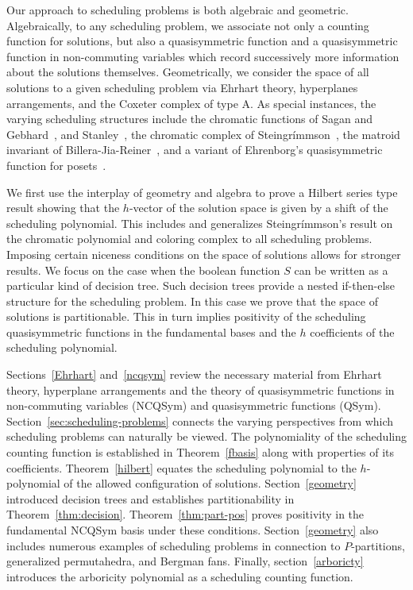 \documentclass[12pt,reqno]{amsart}
\numberwithin{definition}{section}
\theoremstyle{definition}
\begin{document}
Our approach to scheduling problems is both algebraic and geometric.
Algebraically, to any scheduling problem, we associate not only a
counting function for solutions, but also a quasisymmetric function
and a quasisymmetric function in non-commuting variables which record
successively more information about the solutions themselves.
Geometrically, we consider the space of all solutions to a given
scheduling problem via Ehrhart theory, hyperplanes arrangements, and
the Coxeter complex of type A.  As special instances, the varying scheduling structures include the
chromatic functions of Sagan and Gebhard~\cite{GS}, and Stanley~\cite{stan-chromatic}, the chromatic
complex of Stein\-gr\'{i}mm\-son~\cite{Ein}, the matroid invariant of Billera-Jia-Reiner~\cite{BJR},
and a variant of Ehrenborg's quasisymmetric function for posets~\cite{Ehrenborg}.




We first use the interplay of geometry and algebra to prove a Hilbert
series type result showing that the $h$-vector of the solution space
is given by a shift of the scheduling polynomial.  This includes and
generalizes Stein\-gr\'{i}mm\-son's result on the chromatic polynomial and
coloring complex to all scheduling problems.  Imposing certain
niceness conditions on the space of solutions allows for stronger
results.  We focus on the case when the boolean function $S$ can be
written as a particular kind of decision tree.  Such decision trees
provide a nested if-then-else structure for the scheduling problem.
In this case we prove that the space of solutions is partitionable.
This in turn implies positivity of the scheduling quasisymmetric
functions in the fundamental bases and the $h$ coefficients of the
scheduling polynomial.

 

Sections~\ref{Ehrhart} and~\ref{ncqsym} review the necessary material
from Ehrhart theory, hyperplane arrangements and the theory of
quasisymmetric functions in non-commuting variables (NCQSym) and
quasisymmetric functions (QSym).  Section~\ref{sec:scheduling-problems} connects the varying perspectives from which 
scheduling problems can naturally be viewed.
 The polynomiality of the scheduling counting function is established
 in Theorem~\ref{fbasis} along with properties of its coefficients.
 Theorem~\ref{hilbert} equates the scheduling polynomial to the
 $h$-polynomial of the allowed configuration of solutions.
 Section~\ref{geometry} introduced decision trees and establishes
 partitionability in Theorem~\ref{thm:decision}.  Theorem~\ref{thm:part-pos} proves positivity
 in the fundamental NCQSym basis under these conditions.
 Section~\ref{geometry} also includes numerous examples of scheduling
 problems in connection to $P$-partitions, generalized permutahedra,
 and Bergman fans.  Finally, section~\ref{arboricty} introduces the
 arboricity polynomial as a scheduling counting function.
\end{document}
